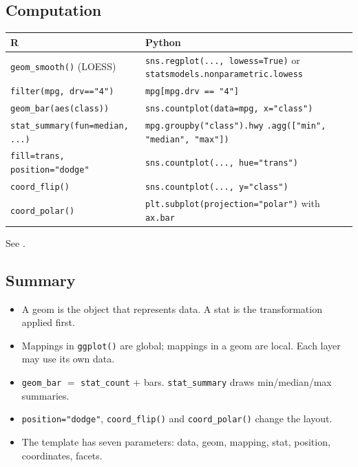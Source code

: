 \subsection{Computation}
\begin{center}
\small\begin{tabular}{@{}>{\raggedright\arraybackslash}p{7.3cm}>{\raggedright\arraybackslash}p{8.3cm}@{}}\hline
R & Python\\\hline
\texttt{geom\_smooth()} (LOESS) & \texttt{sns.regplot(..., lowess=True)} or \texttt{statsmodels.nonparametric.lowess}\\
\texttt{filter(mpg, drv=="4")} & \texttt{mpg[mpg.drv == "4"]}\\
\texttt{geom\_bar(aes(class))} & \texttt{sns.countplot(data=mpg, x="class")}\\
\texttt{stat\_summary(fun=median, ...)} & \texttt{mpg.groupby("class").hwy} \texttt{.agg(["min", "median", "max"])}\\
\texttt{fill=trans, position="dodge"} & \texttt{sns.countplot(..., hue="trans")}\\
\texttt{coord\_flip()} & \texttt{sns.countplot(..., y="class")}\\
\texttt{coord\_polar()} & \texttt{plt.subplot(projection="polar")} with \texttt{ax.bar}\\\hline
\end{tabular}
\end{center}
See .

\subsection{Summary}
\begin{itemize}
  \item A geom is the object that represents data. A stat is the transformation applied first.
  \item Mappings in \texttt{ggplot()} are global; mappings in a geom are local. Each layer may use its own data.
  \item \texttt{geom\_bar} $=$ \texttt{stat\_count} $+$ bars. \texttt{stat\_summary} draws min/median/max summaries.
  \item \texttt{position="dodge"}, \texttt{coord\_flip()} and \texttt{coord\_polar()} change the layout.
  \item The template has seven parameters: data, geom, mapping, stat, position, coordinates, facets.
\end{itemize}

